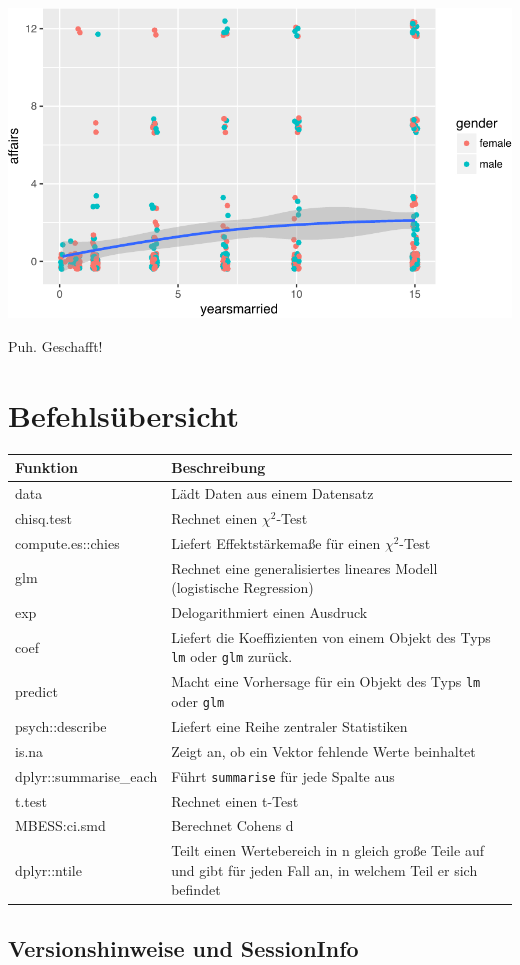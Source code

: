 \documentclass[12pt,ngerman,]{book}
\begin{document}
\begin{center}\includegraphics[width=0.7\linewidth]{076_Fallstudie_Affairs_files/figure-latex/unnamed-chunk-33-1} \end{center}

Puh. Geschafft!

\section{Befehlsübersicht}\label{befehlsubersicht-7}

\begin{longtable}[]{@{}ll@{}}
\toprule
Funktion & Beschreibung\tabularnewline
\midrule
\endhead
data & Lädt Daten aus einem Datensatz\tabularnewline
chisq.test & Rechnet einen \(\chi^2\)-Test\tabularnewline
compute.es::chies & Liefert Effektstärkemaße für einen
\(\chi^2\)-Test\tabularnewline
glm & Rechnet eine generalisiertes lineares Modell (logistische
Regression)\tabularnewline
exp & Delogarithmiert einen Ausdruck\tabularnewline
coef & Liefert die Koeffizienten von einem Objekt des Typs \texttt{lm}
oder \texttt{glm} zurück.\tabularnewline
predict & Macht eine Vorhersage für ein Objekt des Typs \texttt{lm} oder
\texttt{glm}\tabularnewline
psych::describe & Liefert eine Reihe zentraler
Statistiken\tabularnewline
is.na & Zeigt an, ob ein Vektor fehlende Werte beinhaltet\tabularnewline
dplyr::summarise\_each & Führt \texttt{summarise} für jede Spalte
aus\tabularnewline
t.test & Rechnet einen t-Test\tabularnewline
MBESS:ci.smd & Berechnet Cohens d\tabularnewline
dplyr::ntile & Teilt einen Wertebereich in n gleich große Teile auf und
gibt für jeden Fall an, in welchem Teil er sich befindet\tabularnewline
\bottomrule
\end{longtable}

\subsection{Versionshinweise und
SessionInfo}\label{versionshinweise-und-sessioninfo}
\end{document}
